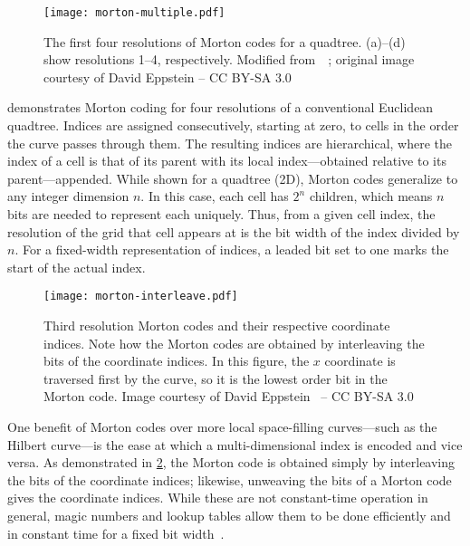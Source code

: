 \begin{figure}[ht!]
	\centering
	\texttt{[image: morton-multiple.pdf]}
	\caption[Four resolutions of Morton codes]{
		The first four resolutions of Morton codes for a quadtree.
		(a)--(d) show resolutions 1--4, respectively.
		Modified from~~\cite{morton-multiple}; original image courtesy of David Eppstein -- CC BY-SA 3.0
	}
	\label{fig:morton-multiple}
\end{figure}


 demonstrates Morton coding for four resolutions of a conventional Euclidean quadtree.
Indices are assigned consecutively, starting at zero, to cells in the order the curve passes through them.
The resulting indices are hierarchical, where the index of a cell is that of its parent with its local index---obtained relative to its parent---appended.
While shown for a quadtree (2D), Morton codes generalize to any integer dimension $n$.
In this case, each cell has $2^n$ children, which means $n$ bits are needed to represent each uniquely.
Thus, from a given cell index, the resolution of the grid that cell appears at is the bit width of the index divided by $n$.
For a fixed-width representation of indices, a leaded bit set to one marks the start of the actual index.


\begin{figure}[htp!]
	\centering
	\texttt{[image: morton-interleave.pdf]}
	\caption[Morton codes by bit-interleaving]{
		Third resolution Morton codes and their respective coordinate indices.
		Note how the Morton codes are obtained by interleaving the bits of the coordinate indices.
		In this figure, the $x$ coordinate is traversed first by the curve, so it is the lowest order bit in the Morton code.
		Image courtesy of David Eppstein~\cite{morton-interleave} -- CC BY-SA 3.0
	}
	\label{fig:morton-interleave}
\end{figure}


One benefit of Morton codes over more local space-filling curves---such as the Hilbert curve---is the ease at which a multi-dimensional index is encoded and vice versa.
As demonstrated in \cref{fig:morton-interleave}, the Morton code is obtained simply by interleaving the bits of the coordinate indices; likewise, unweaving the bits of a Morton code gives the coordinate indices.
While these are not constant-time operation in general, magic numbers and lookup tables allow them to be done efficiently and in constant time for a fixed bit width~\cite{libmorton18}.


